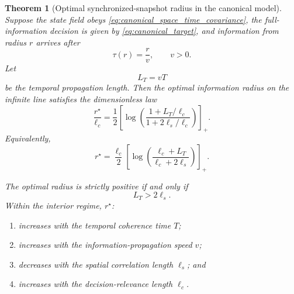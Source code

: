 \documentclass[11pt]{article}
\newtheorem{theorem}{Theorem}
\begin{document}
\begin{theorem}[Optimal synchronized-snapshot radius in the canonical model]
\label{thm:canonical_optimal_radius}
Suppose the state field obeys
\eqref{eq:canonical_space_time_covariance}, the full-information decision is
given by \eqref{eq:canonical_target}, and information from radius $r$ arrives
after
\begin{equation}
    \tau(r)=\frac{r}{v},
    \qquad v>0.
\end{equation}
Let
\begin{equation}
    L_T=vT
\end{equation}
be the temporal propagation length. Then the optimal information radius on
the infinite line satisfies the dimensionless law
\begin{equation}
    \boxed{
    \frac{r^\star}{\ell_c}
    =
    \frac{1}{2}
    \left[
        \log
        \left(
            \frac{
                1+L_T/\ell_c
            }{
                1+2\ell_s/\ell_c
            }
        \right)
    \right]_+.
    }
    \label{eq:canonical_dimensionless_law}
\end{equation}
Equivalently,
\begin{equation}
    \boxed{
    r^\star
    =
    \frac{\ell_c}{2}
    \left[
        \log
        \left(
            \frac{
                \ell_c+L_T
            }{
                \ell_c+2\ell_s
            }
        \right)
    \right]_+.
    }
    \label{eq:canonical_optimal_radius}
\end{equation}

The optimal radius is strictly positive if and only if
\begin{equation}
    \boxed{
    L_T>2\ell_s.
    }
    \label{eq:positive_radius_condition}
\end{equation}
Within the interior regime, $r^\star$:

\begin{enumerate}
    \item increases with the temporal coherence time $T$;
    \item increases with the information-propagation speed $v$;
    \item decreases with the spatial correlation length $\ell_s$; and
    \item increases with the decision-relevance length $\ell_c$.
\end{enumerate}
\end{theorem}
\end{document}

